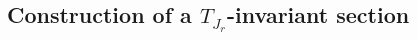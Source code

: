 \documentclass[12pt,reqno]{amsart}
\numberwithin{equation}{section}
\newtheorem{lemma}[theorem]{Lemma}
\theoremstyle{definition}
\begin{document}
\subsection{Construction of a $T_{J_{r}}$-invariant section}
\end{document}
